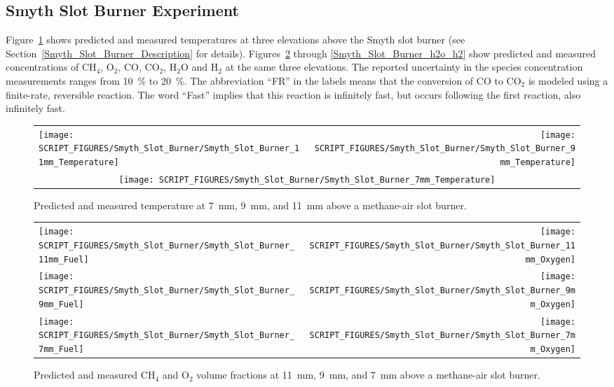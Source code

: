 \subsection{Smyth Slot Burner Experiment}
\label{Smyth_Reactions}

Figure~\ref{Smyth_Slot_Burner_temp} shows predicted and measured temperatures at three elevations above the Smyth slot burner (see Section~\ref{Smyth_Slot_Burner_Description} for details). Figures~\ref{Smyth_Slot_Burner_fuel_ox} through \ref{Smyth_Slot_Burner_h2o_h2} show predicted and measured concentrations of CH$_4$, O$_2$, CO, CO$_2$, H$_2$O and H$_2$ at the same three elevations. The reported uncertainty in the species concentration measurements ranges from 10~\% to 20~\%. The abbreviation ``FR'' in the labels means that the conversion of CO to CO$_2$ is modeled using a finite-rate, reversible reaction. The word ``Fast'' implies that this reaction is infinitely fast, but occurs following the first reaction, also infinitely fast.

\begin{figure}[!h]
\begin{tabular*}{\textwidth}{l@{\extracolsep{\fill}}r}
\texttt{[image: SCRIPT\_FIGURES/Smyth\_Slot\_Burner/Smyth\_Slot\_Burner\_11mm\_Temperature]} &
\texttt{[image: SCRIPT\_FIGURES/Smyth\_Slot\_Burner/Smyth\_Slot\_Burner\_9mm\_Temperature]} \\
\multicolumn{2}{c}{\texttt{[image: SCRIPT\_FIGURES/Smyth\_Slot\_Burner/Smyth\_Slot\_Burner\_7mm\_Temperature]}}
\end{tabular*}
\caption[Temperature predictions at 7~mm, 9~mm, and 11~mm above burner, Smyth experiment]
{Predicted and measured temperature at 7~mm, 9~mm, and 11~mm above a methane-air slot burner.}
\label{Smyth_Slot_Burner_temp}
\end{figure}

\begin{figure}[p]
\begin{tabular*}{\textwidth}{l@{\extracolsep{\fill}}r}
\texttt{[image: SCRIPT\_FIGURES/Smyth\_Slot\_Burner/Smyth\_Slot\_Burner\_11mm\_Fuel]} &
\texttt{[image: SCRIPT\_FIGURES/Smyth\_Slot\_Burner/Smyth\_Slot\_Burner\_11mm\_Oxygen]} \\
\texttt{[image: SCRIPT\_FIGURES/Smyth\_Slot\_Burner/Smyth\_Slot\_Burner\_9mm\_Fuel]} &
\texttt{[image: SCRIPT\_FIGURES/Smyth\_Slot\_Burner/Smyth\_Slot\_Burner\_9mm\_Oxygen]} \\
\texttt{[image: SCRIPT\_FIGURES/Smyth\_Slot\_Burner/Smyth\_Slot\_Burner\_7mm\_Fuel]} &
\texttt{[image: SCRIPT\_FIGURES/Smyth\_Slot\_Burner/Smyth\_Slot\_Burner\_7mm\_Oxygen]}
\end{tabular*}
\caption[CH$_4$ and O$_2$ volume fractions at 11~mm, 9~mm, and 7~mm above burner, Smyth burner]
{Predicted and measured CH$_4$ and O$_2$ volume fractions at 11~mm, 9~mm, and 7~mm above a methane-air slot burner.}
\label{Smyth_Slot_Burner_fuel_ox}
\end{figure}


